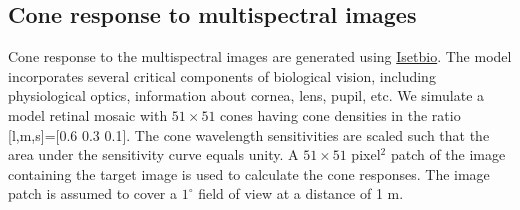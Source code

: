 \documentclass{jov}
\begin{document}
\subsection{Cone response to multispectral images}
Cone response to the multispectral images are generated
using \href{https://github.com/isetbio}{Isetbio}. The model incorporates several critical components of biological vision, including physiological optics, information about cornea, lens, pupil, etc. We simulate a model retinal mosaic with $51\times51$ cones having cone densities in the ratio [l,m,s]=[0.6 0.3 0.1]. The cone wavelength sensitivities are scaled such that the area under the sensitivity curve equals unity. A $51\times51$ pixel$^2$ patch of the image containing the target image is used to calculate the cone responses. The image patch is assumed to cover a $1^{\circ}$ field of view at a distance of 1 m.



\end{document}
